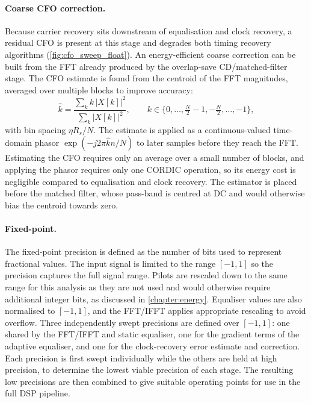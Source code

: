 \documentclass[12pt,a4paper]{report}
\begin{document}
\paragraph{Coarse CFO correction.} Because carrier recovery sits downstream of equalisation and clock recovery, a residual CFO is present at this stage and degrades both timing recovery algorithms (\cref{fig:cfo_sweep_float}). An energy-efficient coarse correction can be built from the FFT already produced by the overlap-save CD/matched-filter stage. The CFO estimate is found from the centroid of the FFT magnitudes, averaged over multiple blocks to improve accuracy:
\begin{equation}
    \hat{k} = \frac{\sum_{k} k\,|X[k]|^2}{\sum_{k} |X[k]|^2}, \qquad k \in \{0,\dots,\tfrac{N}{2}-1,-\tfrac{N}{2},\dots,-1\},
    \label{eq:cfo_centroid}
\end{equation}
with bin spacing $\eta R_s / N$. The estimate is applied as a continuous-valued time-domain phasor $\exp(-j 2\pi \hat{k}n / N)$ to later samples before they reach the FFT. Estimating the CFO requires only an average over a small number of blocks, and applying the phasor requires only one CORDIC operation, so its energy cost is negligible compared to equalisation and clock recovery. The estimator is placed before the matched filter, whose pass-band is centred at DC and would otherwise bias the centroid towards zero.

\paragraph{Fixed-point.} The fixed-point precision is defined as the number of bits used to represent fractional values. The input signal is limited to the range $[-1,1]$ so the precision captures the full signal range. Pilots are rescaled down to the same range for this analysis as they are not used and would otherwise require additional integer bits, as discussed in \cref{chapter:energy}. Equaliser values are also normalised to $[-1,1]$, and the FFT/IFFT applies appropriate rescaling to avoid overflow. Three independently swept precisions are defined over $[-1,1]$: one shared by the FFT/IFFT and static equaliser, one for the gradient terms of the adaptive equaliser, and one for the clock-recovery error estimate and correction. Each precision is first swept individually while the others are held at high precision, to determine the lowest viable precision of each stage. The resulting low precisions are then combined to give suitable operating points for use in the full DSP pipeline.
\end{document}
